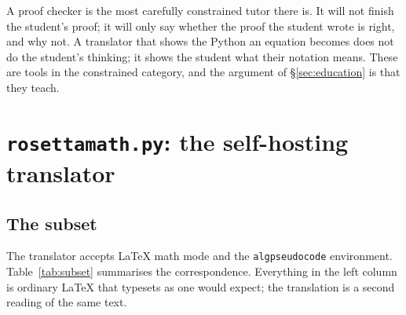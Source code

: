\documentclass[11pt]{article}
\begin{document}
A proof checker is the most carefully constrained tutor there is. It will not
finish the student's proof; it will only say whether the proof the student
wrote is right, and why not. A translator that shows the Python an equation
becomes does not do the student's thinking; it shows the student what their
notation means. These are tools in the constrained category, and the argument
of \S\ref{sec:education} is that they teach.

\section{\texttt{rosettamath.py}: the self-hosting translator}
\label{sec:rosettamath}

\subsection{The subset}

The translator accepts \LaTeX{} math mode and the \texttt{algpseudocode}
environment. Table~\ref{tab:subset} summarises the correspondence. Everything
in the left column is ordinary \LaTeX{} that typesets as one would expect; the
translation is a second reading of the same text.
\end{document}
